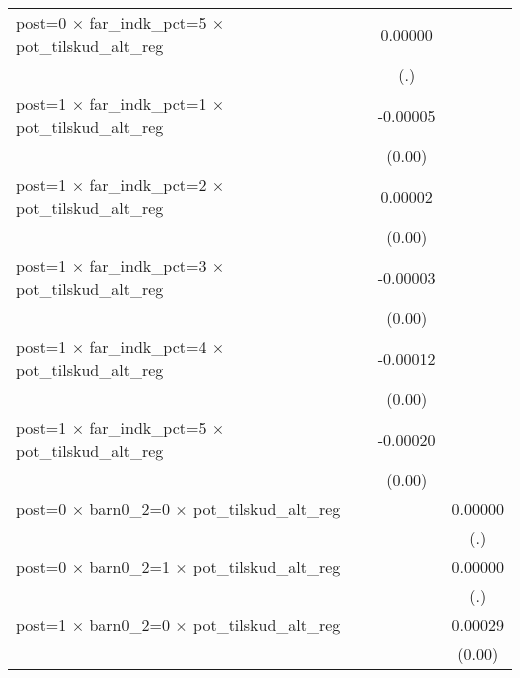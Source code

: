 \begin{table}[htbp]
\begin{tabular}{l*{3}{c}}
post=0 $\times$ far\_indk\_pct=5 $\times$ pot\_tilskud\_alt\_reg&                     &     0.00000         &                     \\
                    &                     &         (.)         &                     \\
post=1 $\times$ far\_indk\_pct=1 $\times$ pot\_tilskud\_alt\_reg&                     &    -0.00005\sym{*}  &                     \\
                    &                     &      (0.00)         &                     \\
post=1 $\times$ far\_indk\_pct=2 $\times$ pot\_tilskud\_alt\_reg&                     &     0.00002         &                     \\
                    &                     &      (0.00)         &                     \\
post=1 $\times$ far\_indk\_pct=3 $\times$ pot\_tilskud\_alt\_reg&                     &    -0.00003         &                     \\
                    &                     &      (0.00)         &                     \\
post=1 $\times$ far\_indk\_pct=4 $\times$ pot\_tilskud\_alt\_reg&                     &    -0.00012\sym{***}&                     \\
                    &                     &      (0.00)         &                     \\
post=1 $\times$ far\_indk\_pct=5 $\times$ pot\_tilskud\_alt\_reg&                     &    -0.00020\sym{***}&                     \\
                    &                     &      (0.00)         &                     \\
post=0 $\times$ barn0\_2=0 $\times$ pot\_tilskud\_alt\_reg&                     &                     &     0.00000         \\
                    &                     &                     &         (.)         \\
post=0 $\times$ barn0\_2=1 $\times$ pot\_tilskud\_alt\_reg&                     &                     &     0.00000         \\
                    &                     &                     &         (.)         \\
post=1 $\times$ barn0\_2=0 $\times$ pot\_tilskud\_alt\_reg&                     &                     &     0.00029\sym{***}\\
                    &                     &                     &      (0.00)         \\

\end{tabular}
\end{table}
